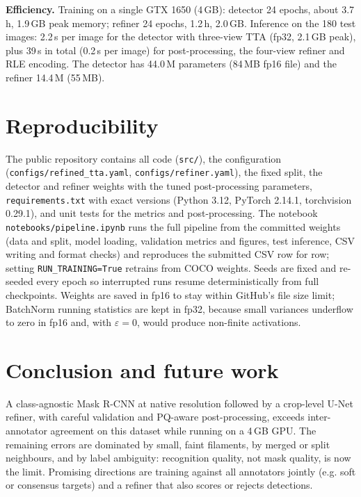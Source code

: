 \textbf{Efficiency.} Training on a single GTX 1650 (4\,GB): detector 24 epochs, about 3.7\,h,
1.9\,GB peak memory; refiner 24 epochs, 1.2\,h, 2.0\,GB. Inference on the 180 test images: 2.2\,s
per image for the detector with three-view TTA (fp32, 2.1\,GB peak), plus 39\,s in total
(0.2\,s per image) for post-processing, the four-view refiner and RLE encoding. The detector has
44.0\,M parameters (84\,MB fp16 file) and the refiner 14.4\,M (55\,MB).

\section{Reproducibility}
The public repository contains all code (\texttt{src/}), the configuration
(\texttt{configs/refined\_tta.yaml}, \texttt{configs/refiner.yaml}), the fixed split, the detector
and refiner weights with the tuned post-processing parameters, \texttt{requirements.txt} with exact versions (Python 3.12, PyTorch
2.14.1, torchvision 0.29.1), and unit tests for the metrics and post-processing. The notebook
\texttt{notebooks/pipeline.ipynb} runs the full pipeline from the committed weights (data and
split, model loading, validation metrics and figures, test inference, CSV writing and format
checks) and reproduces the submitted CSV row for row; setting \texttt{RUN\_TRAINING=True}
retrains from COCO weights. Seeds are fixed and re-seeded every epoch so interrupted runs resume
deterministically from full checkpoints. Weights are saved in fp16 to stay within GitHub's file
size limit; BatchNorm running statistics are kept in fp32, because small variances underflow to
zero in fp16 and, with $\varepsilon=0$, would produce non-finite activations.

\section{Conclusion and future work}
A class-agnostic Mask R-CNN at native resolution followed by a crop-level U-Net refiner, with
careful validation and PQ-aware post-processing, exceeds inter-annotator agreement on this dataset
while running on a 4\,GB GPU. The remaining errors are dominated by small, faint filaments, by
merged or split neighbours, and by label ambiguity: recognition quality, not mask quality, is now
the limit. Promising directions are training against all annotators jointly (e.g. soft or
consensus targets) and a refiner that also scores or rejects detections.

